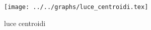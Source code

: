 \begin{figure}[h] \centering\texttt{[image: ../../graphs/luce\_centroidi.tex]}\caption{luce centroidi}\label{gr:luce_centroidi} \end{figure}
